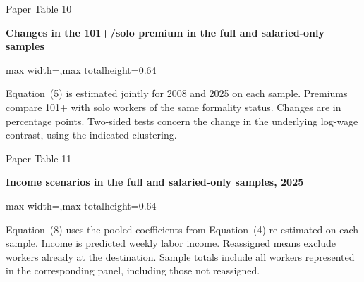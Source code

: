 \begin{frame}{Paper Table 10}
\begin{minipage}{\textwidth}\small\textbf{Changes in the 101+/solo premium in the full and salaried-only samples}\end{minipage}\par\vspace{0.15cm}
\centering\begingroup\fontsize{8.5}{10}\selectfont
\setlength{\tabcolsep}{4pt}\renewcommand{\arraystretch}{1.06}
\begin{adjustbox}{max width=\textwidth,max totalheight=0.64\textheight}

\end{adjustbox}\endgroup\par\vspace{0.10cm}
{\fontsize{6.5}{7.5}\selectfont\raggedright Equation~(5) is estimated jointly for 2008 and 2025 on each sample. Premiums compare 101+ with solo workers of the same formality status. Changes are in percentage points. Two-sided tests concern the change in the underlying log-wage contrast, using the indicated clustering.\par}
\end{frame}

\begin{frame}{Paper Table 11}
\begin{minipage}{\textwidth}\small\textbf{Income scenarios in the full and salaried-only samples, 2025}\end{minipage}\par\vspace{0.15cm}
\centering\begingroup\fontsize{8.5}{10}\selectfont
\setlength{\tabcolsep}{4pt}\renewcommand{\arraystretch}{1.06}
\begin{adjustbox}{max width=\textwidth,max totalheight=0.64\textheight}

\end{adjustbox}\endgroup\par\vspace{0.10cm}
{\fontsize{6.5}{7.5}\selectfont\raggedright Equation~(8) uses the pooled coefficients from Equation~(4) re-estimated on each sample. Income is predicted weekly labor income. Reassigned means exclude workers already at the destination. Sample totals include all workers represented in the corresponding panel, including those not reassigned.\par}
\end{frame}

